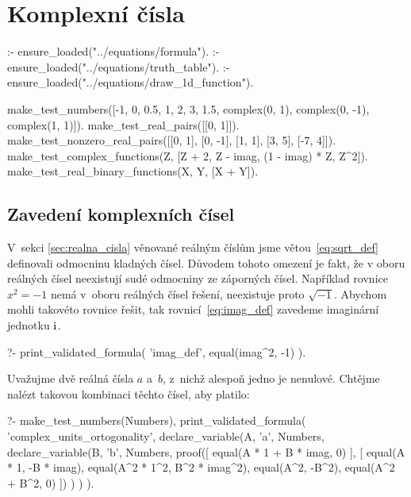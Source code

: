 \chapter{Komplexní čísla}


\begin{prolog}
:- ensure_loaded("../equations/formula").
:- ensure_loaded("../equations/truth_table").
:- ensure_loaded("../equations/draw_1d_function").

make_test_numbers([-1, 0, 0.5, 1, 2, 3, 1.5, complex(0, 1), complex(0, -1), complex(1, 1)]).
make_test_real_pairs([[0, 1]]).%
make_test_nonzero_real_pairs([[0, 1], [0, -1], [1, 1], [3, 5], [-7, 4]]).
make_test_complex_functions(Z, [Z + 2, Z - imag, (1 - imag) * Z, Z^2]).
make_test_real_binary_functions(X, Y, [X + Y]).%
\end{prolog}

\section{Zavedení komplexních čísel}

V~sekci \ref{sec:realna_cisla} věnované reálným číslům jsme větou~\eqref{eq:sqrt_def} definovali odmocninu kladných čísel. Důvodem tohoto omezení je fakt, že v oboru reálných čísel neexistují sudé odmocniny ze záporných čísel. Například rovnice \(x^2 = -1\) nemá v~oboru reálných čísel řešení, neexistuje proto \(\sqrt{-1}\). Abychom mohli takovéto rovnice řešit, tak rovnicí~\eqref{eq:imag_def} zavedeme imaginární jednotku \(\mathrm{i}\).

\begin{fact}
\begin{prolog}
?-	print_validated_formula(
		'imag_def',
		equal(imag^2, -1)
	).
\end{prolog}
\end{fact}

Uvažujme dvě reálná čísla \(a\) a~\(b\), z~nichž alespoň jedno je nenulové. Chtějme nalézt takovou kombinaci těchto čísel, aby platilo:

\begin{prolog}
?-	make_test_numbers(Numbers),
	print_validated_formula(
		'complex_units_ortogonality',
		declare_variable(A, 'a', Numbers,
			declare_variable(B, 'b', Numbers,
				proof([
					equal(A * 1 + B * imag, 0)
				],
				[
					equal(A * 1, -B * imag),
					equal(A^2 * 1^2, B^2 * imag^2),
					equal(A^2, -B^2),
					equal(A^2 + B^2, 0)
				])
			)
		)
	).
\end{prolog}

